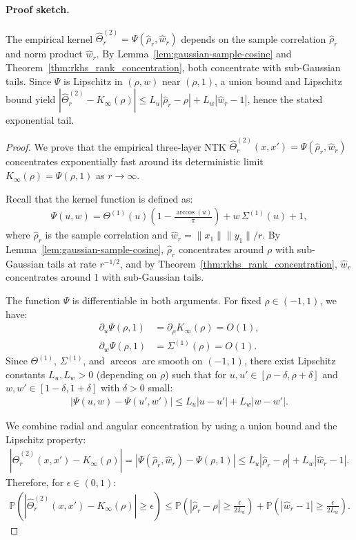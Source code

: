 \paragraph{Proof sketch.} The empirical kernel \(\hat{\Theta}^{(2)}_r=\Psi(\hat{\rho}_r,\hat{w}_r)\) depends on the sample correlation \(\hat{\rho}_r\) and norm product \(\hat{w}_r\). By Lemma~\ref{lem:gaussian-sample-cosine} and Theorem~\ref{thm:rkhs_rank_concentration}, both concentrate with sub-Gaussian tails. Since \(\Psi\) is Lipschitz in \((\rho,w)\) near \((\rho,1)\), a union bound and Lipschitz bound yield \(|\hat{\Theta}^{(2)}_r-K_\infty(\rho)|\le L_u|\hat{\rho}_r-\rho|+L_w|\hat{w}_r-1|\), hence the stated exponential tail.
\begin{proof}
We prove that the empirical three-layer NTK \( \hat{\Theta}^{(2)}_r(x,x') = \Psi(\hat{\rho}_r, \hat{w}_r) \) concentrates exponentially fast around its deterministic limit \( K_{\infty}(\rho) = \Psi(\rho, 1) \) as \( r \to \infty \).


Recall that the kernel function is defined as:
\begin{align}
\Psi(u,w) = \Theta^{(1)}(u)\!\left(1-\frac{\arccos(u)}{\pi}\right) + w\,\Sigma^{(1)}(u) + 1,
\end{align}
where \( \hat{\rho}_r \) is the sample correlation and \( \hat{w}_r = \|x_1\|\|y_1\|/r \). By Lemma~\ref{lem:gaussian-sample-cosine}, \( \hat{\rho}_r \) concentrates around \(\rho\) with sub-Gaussian tails at rate \(r^{-1/2}\), and by Theorem~\ref{thm:rkhs_rank_concentration}, \( \hat{w}_r \) concentrates around 1 with sub-Gaussian tails.


The function \( \Psi \) is differentiable in both arguments. For fixed \( \rho \in (-1,1) \), we have:
\begin{align}
\partial_u \Psi(\rho,1) &= \partial_\rho K_{\infty}(\rho) = O(1), \\
\partial_w \Psi(\rho,1) &= \Sigma^{(1)}(\rho) = O(1).
\end{align}
Since \( \Theta^{(1)} \), \( \Sigma^{(1)} \), and \( \arccos \) are smooth on \( (-1,1) \), there exist Lipschitz constants \( L_u, L_w > 0 \) (depending on \( \rho \)) such that for \( u, u' \in [\rho-\delta, \rho+\delta] \) and \( w, w' \in [1-\delta, 1+\delta] \) with \( \delta > 0 \) small:
\begin{align}
|\Psi(u,w) - \Psi(u',w')| \le L_u|u-u'| + L_w|w-w'|.
\end{align}

We combine radial and angular concentration by using a union bound and the Lipschitz property:
\begin{align}
|\hat{\Theta}^{(2)}_r(x,x') - K_{\infty}(\rho)| = |\Psi(\hat{\rho}_r, \hat{w}_r) - \Psi(\rho, 1)| \le L_u|\hat{\rho}_r - \rho| + L_w|\hat{w}_r - 1|.
\end{align}
Therefore, for \( \epsilon \in (0,1) \):
\begin{align}
\mathbb{P}\!\left(|\hat{\Theta}^{(2)}_r(x,x') - K_{\infty}(\rho)| \ge \epsilon\right) \le \mathbb{P}\!\left(|\hat{\rho}_r - \rho| \ge \frac{\epsilon}{2L_u}\right) + \mathbb{P}\!\left(|\hat{w}_r - 1| \ge \frac{\epsilon}{2L_w}\right).
\end{align}


\end{proof}

